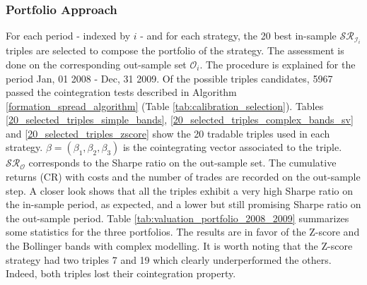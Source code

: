 \documentclass[11pt,a4,twosided,singlespacing,titlepagenumber=on]{scrreprt}
\numberwithin{equation}{chapter} %
\theoremstyle{remark}
\begin{document}
\subsubsection{Portfolio Approach}
For each period - indexed by $i$ - and for each strategy, the 20 best in-sample $\mathcal{SR}_{\mathcal{I}_i}$ triples are selected to compose the portfolio of the strategy. The assessment is done on the corresponding out-sample set $\mathcal{O}_i$. The procedure is explained for the period Jan, 01 2008 - Dec, 31 2009. Of the possible triples candidates, 5967 passed the cointegration tests described in Algorithm \ref{formation_spread_algorithm} (Table \ref{tab:calibration_selection}). Tables \ref{20_selected_triples_simple_bands}, \ref{20_selected_triples_complex_bands_sv} and \ref{20_selected_triples_zscore} show the 20 tradable triples used in each strategy. $\beta = (\beta_1, \beta_2, \beta_3)$ is the cointegrating vector associated to the triple. $\mathcal{SR}_\mathcal{O}$ corresponds to the Sharpe ratio on the out-sample set. The cumulative returns (CR) with costs and the number of trades are recorded on the out-sample step. A closer look shows that all the triples exhibit a very high Sharpe ratio on the in-sample period, as expected, and a lower but still promising Sharpe ratio on the out-sample period. Table \ref{tab:valuation_portfolio_2008_2009} summarizes some statistics for the three portfolios. The results are in favor of the Z-score and the Bollinger bands with complex modelling. It is worth noting that the Z-score strategy had two triples 7 and 19 which clearly underperformed the others. Indeed, both triples lost their cointegration property.
\end{document}
